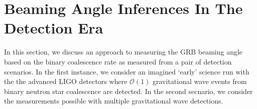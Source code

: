 \documentclass[twocolumn,nofootinbib]{revtex4-1}
\newcommand{\cbcrate}{{{\mathcal R}}}
\begin{document}
\section{Beaming Angle Inferences In The Detection Era}
In this section, we discuss an approach to measuring the GRB beaming angle based
on the binary coalescence rate as measured from a pair of detection scenarios.
In the first instance, we consider an imagined `early' science run with the the
advanced LIGO detectors where ${\mathcal O}(1)$ gravitational wave events from
binary neutron star coalescence are detected.  In the second secnario, we
consider the measurements possible with multiple gravitational wave detections.

%
%
\end{document}
